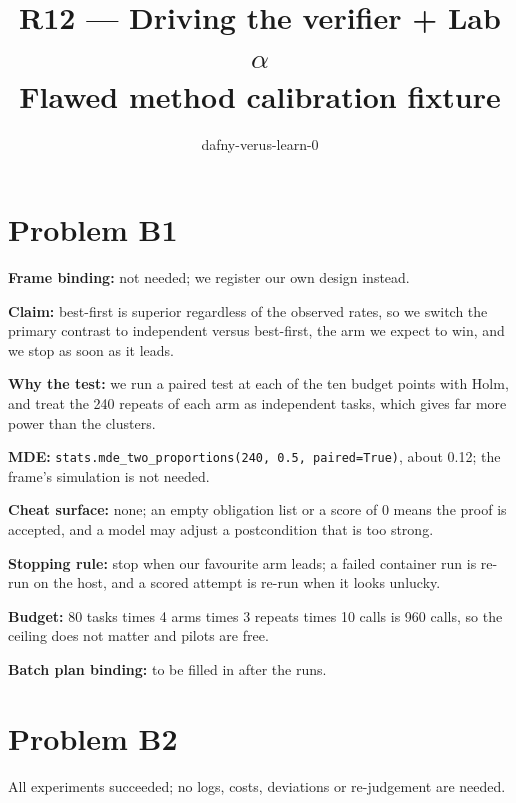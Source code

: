 \documentclass[11pt]{article}
\title{R12 --- Driving the verifier + Lab $\alpha$ \\ \large Flawed method calibration fixture}
\author{dafny-verus-learn-0}
\date{}
\begin{document}
\maketitle
\sloppy
\section*{Problem B1}\label{ans:B1}
\begin{answer}
\textbf{Frame binding:} not needed; we register our own design instead.

\textbf{Claim:} best-first is superior regardless of the observed rates, so we
switch the primary contrast to independent versus best-first, the arm we expect
to win, and we stop as soon as it leads.

\textbf{Why the test:} we run a paired test at each of the ten budget points with
Holm, and treat the 240 repeats of each arm as independent tasks, which gives
far more power than the clusters.

\textbf{MDE:} \texttt{stats.mde\_two\_proportions(240, 0.5, paired=True)}, about
0.12; the frame's simulation is not needed.

\textbf{Cheat surface:} none; an empty obligation list or a score of 0 means the
proof is accepted, and a model may adjust a postcondition that is too strong.

\textbf{Stopping rule:} stop when our favourite arm leads; a failed container run
is re-run on the host, and a scored attempt is re-run when it looks unlucky.

\textbf{Budget:} 80 tasks times 4 arms times 3 repeats times 10 calls is 960 calls,
so the ceiling does not matter and pilots are free.

\textbf{Batch plan binding:} to be filled in after the runs.
\end{answer}
\section*{Problem B2}\label{ans:B2}
\begin{answer}
All experiments succeeded; no logs, costs, deviations or re-judgement are needed.
\end{answer}
\end{document}
